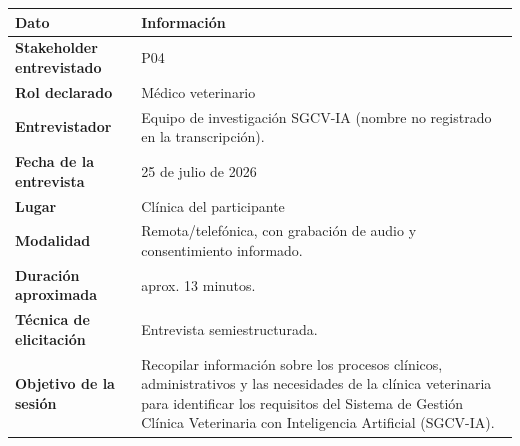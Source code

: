 \documentclass[
]{article}
\newcounter{none} %
\begin{document}
{\def\LTcaptype{none} %
\begin{longtable}[]{|
  >{\raggedright\arraybackslash}p{}|
  >{\raggedright\arraybackslash}p{}|}
\hline
\begin{minipage}[b]{\linewidth}\centering
\textbf{Dato}
\end{minipage} & \begin{minipage}[b]{\linewidth}\centering
\textbf{Información}
\end{minipage} \\
\hline
\endhead
\hline
\endlastfoot
\textbf{Stakeholder entrevistado} & \begin{minipage}[t]{\linewidth}\raggedright
P04
\end{minipage} \\
\hline
\textbf{Rol declarado} & \begin{minipage}[t]{\linewidth}\raggedright
Médico veterinario
\end{minipage} \\
\hline
\textbf{Entrevistador} & \begin{minipage}[t]{\linewidth}\raggedright
Equipo de investigación SGCV-IA (nombre no registrado en la transcripción).
\end{minipage} \\
\hline
\textbf{Fecha de la entrevista} & \begin{minipage}[t]{\linewidth}\raggedright
25 de julio de 2026
\end{minipage} \\
\hline
\textbf{Lugar} & \begin{minipage}[t]{\linewidth}\raggedright
Clínica del participante
\end{minipage} \\
\hline
\textbf{Modalidad} & \begin{minipage}[t]{\linewidth}\raggedright
Remota/telefónica, con grabación de audio y consentimiento informado.
\end{minipage} \\
\hline
\textbf{Duración aproximada} & \begin{minipage}[t]{\linewidth}\raggedright
aprox. 13 minutos.
\end{minipage} \\
\hline
\textbf{Técnica de elicitación} & \begin{minipage}[t]{\linewidth}\raggedright
Entrevista semiestructurada.
\end{minipage} \\
\hline
\textbf{Objetivo de la sesión} & \begin{minipage}[t]{\linewidth}\raggedright
Recopilar información sobre los procesos clínicos, administrativos y las necesidades de la clínica veterinaria para identificar los requisitos del Sistema de Gestión Clínica Veterinaria con Inteligencia Artificial (SGCV-IA).
\end{minipage} \\
\hline
\end{longtable}
}
\end{document}
